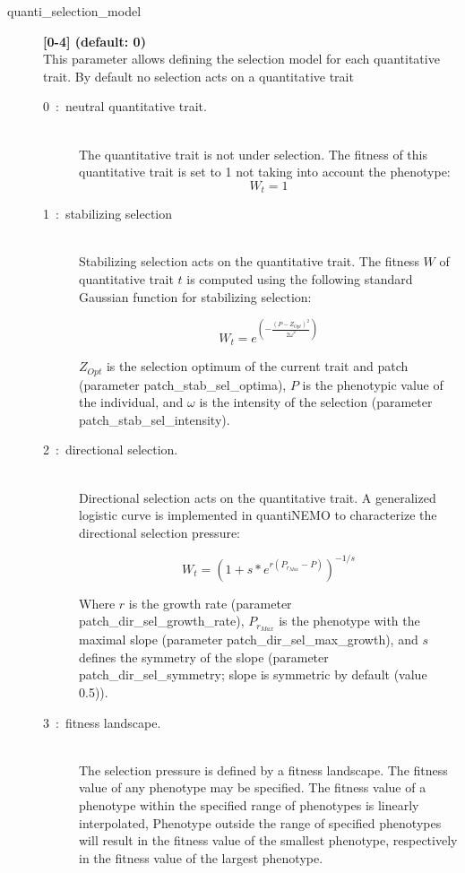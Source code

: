 \documentclass[letterpaper,12pt,oneside]{book}
\begin{document}
\begin{description}

\item[quanti\_selection\_model]\textbf{[0-4] (default: 0)}\\
This parameter allows defining the selection model for each quantitative trait. By default no
selection acts on a quantitative trait
\begin{description}

\item [0~:~neutral quantitative trait.] \textbf{}\\
The quantitative trait is not under selection. The fitness of this quantitative trait is set to 1 not taking into account the phenotype:
\[ W_{t} = 1\]
 
\item [1~:~stabilizing selection] \textbf{}\\
Stabilizing selection acts on the quantitative trait. The fitness $W$ of quantitative trait $t$ is
computed using the following standard Gaussian function for stabilizing selection:

\[W_{t} = e^{\left(-\frac{\left(P-Z_{Opt}\right)^2}{2\omega^{2}}\right)} \]

$Z_{Opt}$ is the selection optimum of the current trait and patch (parameter \textsf{patch\_stab\_sel\_optima}), $P$ is the phenotypic value of the individual, and $\omega$ is the intensity of the selection (parameter \textsf{patch\_stab\_sel\_intensity}). 

\item [2~:~directional selection.] \textbf{}\\
Directional selection acts on the quantitative trait. A generalized logistic curve \citep{Richards_1959} is implemented in quantiNEMO to characterize the directional selection pressure:

	\[ W_{t} = \left(1+s*e^{r(P_{r_{Max}}-P)}\right)^{-1/s}\]

Where $r$ is the growth rate (parameter \textsf{patch\_dir\_sel\_growth\_rate}), $P_{r_{Max}}$ is the phenotype with the maximal slope (parameter \textsf{patch\_dir\_sel\_max\_growth}), and $s$ defines the symmetry of the slope (parameter \textsf{patch\_dir\_sel\_symmetry}; slope is symmetric by default (value 0.5)).

\item [3~:~fitness landscape.] \textbf{}\\
The selection pressure is defined by a fitness landscape. The fitness value of any phenotype may be specified. The fitness value of a phenotype within the specified range of phenotypes is linearly interpolated, Phenotype outside the range of specified phenotypes will result in the fitness value of the smallest phenotype, respectively in the fitness value of the largest phenotype.
 

\end{description}
\end{description}
\end{document}
